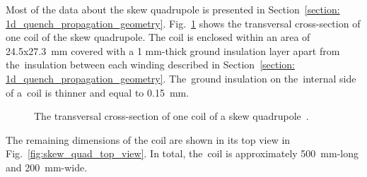 
Most of the data about the skew quadrupole is presented in Section~\ref{section: 1d_quench_propagation_geometry}. Fig.~\ref{fig:skew_quad_transversal_cross_section} shows the transversal cross-section of one coil of the skew quadrupole. The coil is enclosed within an area of 24.5x27.3~mm covered with a 1 mm-thick ground insulation layer apart from the~insulation between each winding described in Section~\ref{section: 1d_quench_propagation_geometry}. The~ground insulation on the~internal side of a~coil is thinner and equal to 0.15~mm.

\begin{figure}[H]
    \centering
    \caption{The transversal cross-section of one coil of a skew quadrupole~\cite{samuele_mariotto_mails}.}
    \label{fig:skew_quad_transversal_cross_section}
\end{figure}

The remaining dimensions of the coil are shown in its top view in Fig.~\ref{fig:skew_quad_top_view}. In total, the~coil is approximately 500~mm-long and 200~mm-wide.

